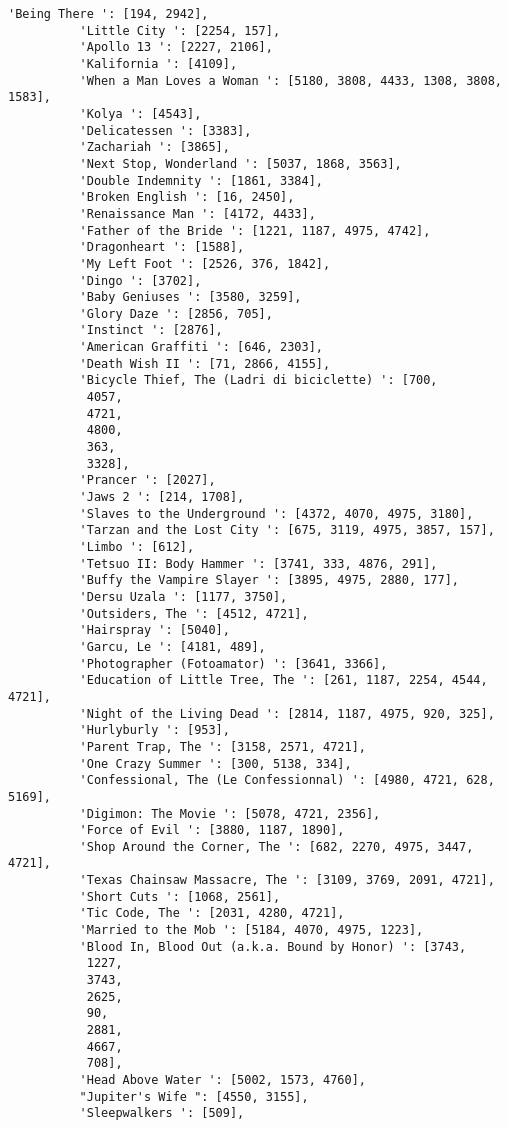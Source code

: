 \documentclass[11pt]{article}
\begin{document}
\begin{Verbatim}[commandchars=\\\{\}]
          'Being There ': [194, 2942],
          'Little City ': [2254, 157],
          'Apollo 13 ': [2227, 2106],
          'Kalifornia ': [4109],
          'When a Man Loves a Woman ': [5180, 3808, 4433, 1308, 3808, 1583],
          'Kolya ': [4543],
          'Delicatessen ': [3383],
          'Zachariah ': [3865],
          'Next Stop, Wonderland ': [5037, 1868, 3563],
          'Double Indemnity ': [1861, 3384],
          'Broken English ': [16, 2450],
          'Renaissance Man ': [4172, 4433],
          'Father of the Bride ': [1221, 1187, 4975, 4742],
          'Dragonheart ': [1588],
          'My Left Foot ': [2526, 376, 1842],
          'Dingo ': [3702],
          'Baby Geniuses ': [3580, 3259],
          'Glory Daze ': [2856, 705],
          'Instinct ': [2876],
          'American Graffiti ': [646, 2303],
          'Death Wish II ': [71, 2866, 4155],
          'Bicycle Thief, The (Ladri di biciclette) ': [700,
           4057,
           4721,
           4800,
           363,
           3328],
          'Prancer ': [2027],
          'Jaws 2 ': [214, 1708],
          'Slaves to the Underground ': [4372, 4070, 4975, 3180],
          'Tarzan and the Lost City ': [675, 3119, 4975, 3857, 157],
          'Limbo ': [612],
          'Tetsuo II: Body Hammer ': [3741, 333, 4876, 291],
          'Buffy the Vampire Slayer ': [3895, 4975, 2880, 177],
          'Dersu Uzala ': [1177, 3750],
          'Outsiders, The ': [4512, 4721],
          'Hairspray ': [5040],
          'Garcu, Le ': [4181, 489],
          'Photographer (Fotoamator) ': [3641, 3366],
          'Education of Little Tree, The ': [261, 1187, 2254, 4544, 4721],
          'Night of the Living Dead ': [2814, 1187, 4975, 920, 325],
          'Hurlyburly ': [953],
          'Parent Trap, The ': [3158, 2571, 4721],
          'One Crazy Summer ': [300, 5138, 334],
          'Confessional, The (Le Confessionnal) ': [4980, 4721, 628, 5169],
          'Digimon: The Movie ': [5078, 4721, 2356],
          'Force of Evil ': [3880, 1187, 1890],
          'Shop Around the Corner, The ': [682, 2270, 4975, 3447, 4721],
          'Texas Chainsaw Massacre, The ': [3109, 3769, 2091, 4721],
          'Short Cuts ': [1068, 2561],
          'Tic Code, The ': [2031, 4280, 4721],
          'Married to the Mob ': [5184, 4070, 4975, 1223],
          'Blood In, Blood Out (a.k.a. Bound by Honor) ': [3743,
           1227,
           3743,
           2625,
           90,
           2881,
           4667,
           708],
          'Head Above Water ': [5002, 1573, 4760],
          "Jupiter's Wife ": [4550, 3155],
          'Sleepwalkers ': [509],

\end{Verbatim}
\end{document}
